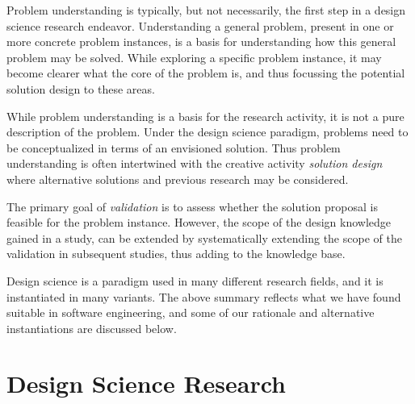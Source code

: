 \documentclass[graybox]{svmult}
\newcommand{\emelie}[1]{\textcolor{red}{{\it [Emelie says: #1]}}}
\newcommand{\emelie}[1]{}
\begin{document}
Problem understanding is typically, but not necessarily, the first step in a design science research endeavor. Understanding a general problem, present in one or more concrete problem instances, is a basis for understanding how this general problem may be solved.  While exploring a specific problem instance,   it may become clearer what the core of the problem is, and thus focussing the potential solution design to these areas. 

While problem understanding is a basis for the research activity, it is not a pure description of the problem. Under the design science paradigm, problems need to be conceptualized in terms of an envisioned solution. Thus problem understanding is often intertwined with the creative activity \emph{solution design} where alternative solutions and previous research may be considered. %


 The primary goal of \emph{validation} is to assess whether the solution proposal is feasible for the problem instance. However, the scope of the design knowledge gained in a study, can be extended by systematically extending the scope of the validation in subsequent studies, thus adding to the knowledge base. 



Design science is a paradigm used in many different research fields, and it is instantiated in many variants.  The above summary reflects what we have found suitable in software engineering, and some of our rationale and alternative instantiations are discussed below.





\section{Design Science Research}
\end{document}
